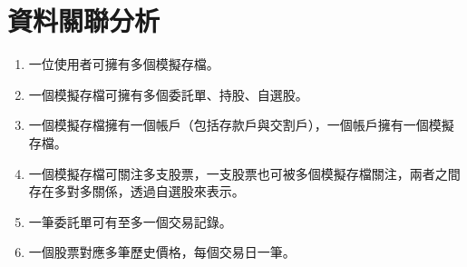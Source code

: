 \documentclass[UTF8, a4paper, 12pt, fontset=none]{ctexart}
\begin{document}
    \section{資料關聯分析}
    \begin{enumerate}
        \item 一位使用者可擁有多個模擬存檔。
        \item 一個模擬存檔可擁有多個委託單、持股、自選股。
        \item 一個模擬存檔擁有一個帳戶（包括存款戶與交割戶），一個帳戶擁有一個模擬存檔。
        \item 一個模擬存檔可關注多支股票，一支股票也可被多個模擬存檔關注，兩者之間存在多對多關係，透過自選股來表示。
        \item 一筆委託單可有至多一個交易記錄。
        \item 一個股票對應多筆歷史價格，每個交易日一筆。
    \end{enumerate}
\end{document}
